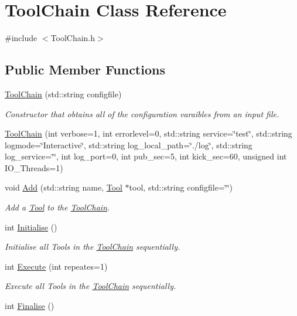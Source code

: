 \hypertarget{classToolChain}{\section{Tool\-Chain Class Reference}
\label{classToolChain}
}


{\ttfamily \#include $<$Tool\-Chain.\-h$>$}

\subsection*{Public Member Functions}
\begin{DoxyCompactItemize}
\item 
\hyperlink{classToolChain_a75af494cf7d613290c48fcbcdb700482}{Tool\-Chain} (std\-::string configfile)
\begin{DoxyCompactList}\small\item\em Constructor that obtains all of the configuration varaibles from an input file. \end{DoxyCompactList}\item 
\hyperlink{classToolChain_a82c1596d9d6e233492e29ac83e2f8952}{Tool\-Chain} (int verbose=1, int errorlevel=0, std\-::string service=\char`\"{}test\char`\"{}, std\-::string logmode=\char`\"{}Interactive\char`\"{}, std\-::string log\-\_\-local\-\_\-path=\char`\"{}./log\char`\"{}, std\-::string log\-\_\-service=\char`\"{}\char`\"{}, int log\-\_\-port=0, int pub\-\_\-sec=5, int kick\-\_\-sec=60, unsigned int I\-O\-\_\-\-Threads=1)
\item 
void \hyperlink{classToolChain_a4da0c02154a0597704e58836d6607e61}{Add} (std\-::string name, \hyperlink{classTool}{Tool} $\ast$tool, std\-::string configfile=\char`\"{}\char`\"{})
\begin{DoxyCompactList}\small\item\em Add a \hyperlink{classTool}{Tool} to the \hyperlink{classToolChain}{Tool\-Chain}. \end{DoxyCompactList}\item 
\hypertarget{classToolChain_a341f343926341b82a29c586a7b9683af}{int \hyperlink{classToolChain_a341f343926341b82a29c586a7b9683af}{Initialise} ()}\label{classToolChain_a341f343926341b82a29c586a7b9683af}

\begin{DoxyCompactList}\small\item\em Initialise all Tools in the \hyperlink{classToolChain}{Tool\-Chain} sequentially. \end{DoxyCompactList}\item 
int \hyperlink{classToolChain_a303e299293fd4d3a5e91865e04898e52}{Execute} (int repeates=1)
\begin{DoxyCompactList}\small\item\em Execute all Tools in the \hyperlink{classToolChain}{Tool\-Chain} sequentially. \end{DoxyCompactList}\item 
\hypertarget{classToolChain_a3828756135773fb9ca4b361a47296dd9}{int \hyperlink{classToolChain_a3828756135773fb9ca4b361a47296dd9}{Finalise} ()}\label{classToolChain_a3828756135773fb9ca4b361a47296dd9}


\end{DoxyCompactItemize}
